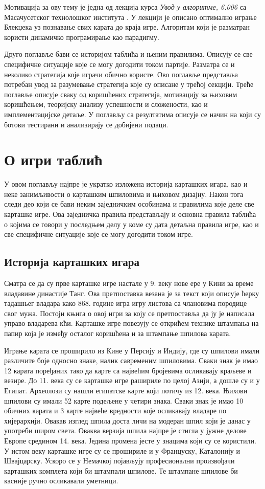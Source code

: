 \documentclass[a4paper, 12pt, ngerman]{article}
\let\oldsection\section
\renewcommand\section{\clearpage\oldsection}
\let\oldsubsection\subsection
\renewcommand\subsection{\clearpage\oldsubsection}
\newcommand{\quotesrb}[1]{\glqq#1\grqq}
\begin{document}
Мотивација за ову тему је једна од лекција курса \textit{Увод у алгоритме, 6.006} са Масачусетског технолошког института \cite{mit6006}. У лекцији је описано оптимално играње Блекџека уз познавање свих карата до краја игре. Алгоритам који је разматран користи динамичко програмирање као парадигму.

Друго поглавље бави се историјом таблића и њеним правилима. Описују се све специфичне ситуације које се могу догодити током партије. Разматра се и неколико стратегија које играчи обично користе. Ово поглавље представља потребан увод за разумевање стратегија које су описане у трећој секцији. Треће поглавље описује сваку од коришћених стратегија, мотивацију за њиховим коришћењем, теоријску анализу успешности и сложености, као и имплементацијске детаље. У поглављу са резултатима описује се начин на који су ботови тестирани и анализирају се добијени подаци. 



\section{О игри таблић}
У овом поглављу најпре је укратко изложена историја карташких игара, као и неке занимљивости о карташким шпиловима и њиховом дизајну. Након тога следи део који се бави неким заједничким особинама и правилима које деле све карташке игре. Ова заједничка правила представљају и основна правила таблића о којима се говори у последњем делу у коме су дата детаљна правила игре, као и све специфичне ситуације које се могу догодити током игре.
\subsection{Историја карташких игара}
Сматра се да су прве карташке игре настале у 9. веку нове ере у Кини за време владавине династије Танг. Ова претпоставка везана је за текст који описује ћерку тадашњег владара како 868. године игра \quotesrb{игру листова} са члановима породице свог мужа. Постоји књига о овој игри за коју се претпоставља да ју је написала управо владарева кћи. Карташке игре повезују се открићем технике штампања на папир која је између осталог коришћена и за штампање шпилова карата.

Играње карата се проширило из Кине у Персију и Индију, где су шпилови имали различите боје односно знаке, налик савременим шпиловима. Сваки знак је имао 12 карата поређаних тако да карте са највећим бројевима осликавају краљеве и везире. До 11. века су се карташке игре рашириле по целој Азији, а дошле су и у Египат. Археолози су нашли египатске карте који потичу из 12. века. Њихови шпилови су имали 52 карте подељене у четири знака. Сваки знак је имао 10 обичних карата и 3 карте највеће вредности које осликавају владаре по хијерархији. Овакав изглед шпила доста личи на модеран шпил који је данас у употреби широм света. Оваква верзија шпила најпре је стигла у јужне делове Европе средином 14. века. Једина промена јесте у знацима који су се користили. У истом веку карташке игре су се прошириле и у Француску, Каталонију и Швајцарску. Ускоро се у Немачкој појављују професионални произвођачи карташких комплета који би штампали шпилове. Те штампане шпилове би касније ручно осликавали уметници. 
\end{document}
